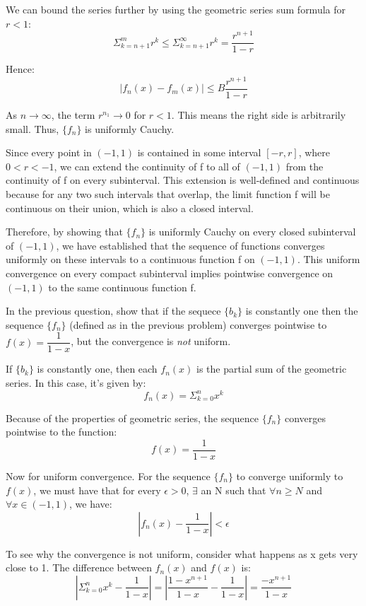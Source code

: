\documentclass[answers]{exam}
\theoremstyle{remark}
\theoremstyle{definition}
\begin{document}
\begin{questions}
\begin{solution}
We can bound the series further by using the geometric
series sum formula for $r < 1$:
\[\Sigma_{k=n+1}^m r^k \leq \Sigma_{k=n+1}^{\infty} r^k = \frac{r^{n+1}}{1-r}\]

Hence:
\[|f_n(x) - f_m(x)| \leq B \frac{r^{n+1}}{1-r}\]

As $n \to \infty$, the term $r^{n_1} \to 0$ for $r < 1$. This means the right
side is arbitrarily small. Thus, $\{f_n\}$ is uniformly Cauchy.

Since every point in $(-1, 1)$ is contained in some interval $[-r, r]$,
where $0 < r < -1$, we can extend the continuity of f to all of $(-1, 1)$
from the continuity of f on every subinterval. This extension is well-defined
and continuous because for any two such intervals that overlap, the limit function
f will be continuous on their union, which is also a closed interval.

Therefore, by showing that $\{f_n\}$ is uniformly Cauchy on every closed subinterval
of $(-1, 1)$, we have established that the sequence of functions converges uniformly
on these intervals to a continuous function f on $(-1, 1)$. This uniform convergence
on every compact subinterval implies pointwise convergence on $(-1, 1)$ to
the same continuous function f.

\end{solution}
\question[4] In the previous question, show that if the sequece $\{b_k\}$ is constantly one then the sequence $\{f_n\}$ (defined as in the previous problem) converges pointwise to $f(x)=\dfrac{1}{1-x}$, but the convergence is \emph{not} uniform.
\begin{solution}

If $\{b_k\}$ is constantly one, then each $f_n(x)$ is the partial sum
of the geometric series. In this case, it's given by:
\[f_n(x) = \Sigma_{k=0}^n x^k\]

Because of the properties of geometric series, the sequence
$\{f_n\}$ converges pointwise to the function:
\[f(x) = \frac{1}{1-x}\]

Now for uniform convergence. For the sequence $\{f_n\}$ to converge
uniformly to $f(x)$, we must have that for every $\epsilon > 0$,
$\exists$ an N such that $\forall n \geq N$ and $\forall x \in (-1, 1)$, we have:
\[|f_n(x) - \frac{1}{1-x}| < \epsilon\]

To see why the convergence is not uniform, consider what happens as x gets
very close to 1. The difference between $f_n(x)$ and $f(x)$ is:
\[|\Sigma_{k=0}^n x^k - \frac{1}{1-x}| = |\frac{1-x^{n+1}}{1-x} - \frac{1}{1-x}| = \frac{-x^{n+1}}{1-x}\]


\end{solution}
\end{questions}
\end{document}
